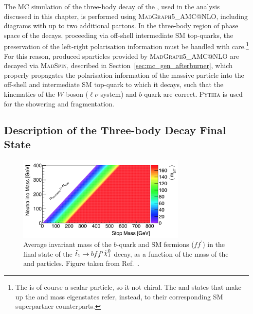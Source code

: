 The MC simulation of the three-body decay of the \stopone, used in the analysis discussed in 
this chapter, is performed using \textsc{MadGraph5\_AMC@NLO}, including diagrams with up to
two additional partons.
In the three-body region of phase space of the \stopone decays, proceeding via off-shell
intermediate SM top-quarks, the preservation of the \stopone left-right polarisation information
must be handled with care.\footnote{The
\stopone is of course a scalar particle, so it not chiral.
The \stopL and \stopR  states that make up the \stopone and \stoptwo mass eigenstates refer, instead, 
to their corresponding SM superpartner counterparts.
}
For this reason, produced \stop sparticles provided by \textsc{MadGraph5\_AMC@NLO} are decayed
via \textsc{MadSpin}, described in Section~\ref{sec:mc_gen_afterburner}, which properly
propagates the polarisation information of the massive \stopone particle into the
off-shell and intermediate SM top-quark to which it decays, such that the kinematics of the
$W$-boson ($\ell \nu$ system) and $b$-quark are correct.
\textsc{Pythia} is used for the showering and fragmentation.

\subsection{Description of the Three-body Decay Final State}
\label{sec:stop_final_state}

\begin{figure}[!htb]
    \begin{center}
        \includegraphics[width=0.75\textwidth]{figures/search_stop2l/nachman_stop_phase_space}
        \caption{
            Average invariant mass of the $b$-quark and SM fermions ($f f^{\prime}$) in the
            final state of the $\stopone \rightarrow b f f^{\prime} \ninoone$ decay, as a function of the mass
            of the \stopone and \ninoone particles.
            Figure taken from Ref.~\cite{Nachman:2016qyc}.
        }
        \label{fig:stop_phase_space}
    \end{center}
\end{figure}

